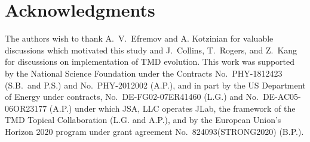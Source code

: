 \documentclass[a4paper]{article}
\newcommand*{\BibPath}{.}%
\begin{document}
\section*{Acknowledgments}
The authors wish to thank A.~V.~Efremov and A. Kotzinian for valuable discussions 
which motivated this study and J.~Collins, T.~Rogers, and Z.~Kang for discussions on implementation of TMD evolution.
This work was supported by the National Science Foundation under the
Contracts No.\ 
PHY-1812423 (S.B.\ and P.S.) and No.~PHY-2012002 (A.P.), 
and in part by the US Department of Energy under contracts, No.~DE-FG02-07ER41460 (L.G.) 
and No.~DE-AC05-06OR23177 (A.P.) under which JSA, LLC operates JLab, the framework of the TMD Topical Collaboration (L.G. and A.P.), and by the European Union's Horizon 2020 program under grant agreement No.~824093(STRONG2020) (B.P.).


\end{document}
